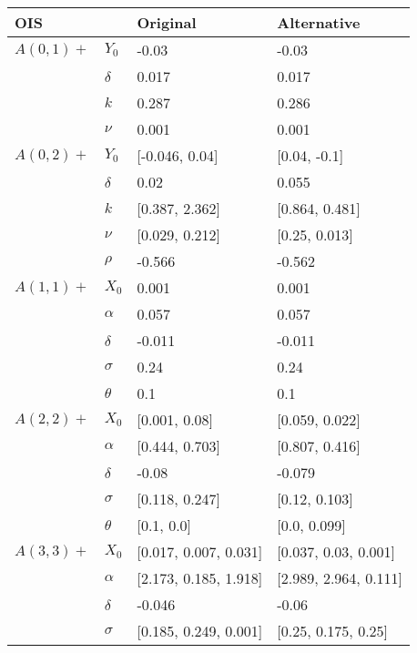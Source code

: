 \begin{tabular}{llll}
	\toprule
	OIS&       &               Original &            Alternative \\
	\midrule
	$A(0, 1)+$ & $Y_0$ &                  -0.03 &                  -0.03 \\
	& $\delta$ &                  0.017 &                  0.017 \\
	& $k$ &                  0.287 &                  0.286 \\
	& $\nu$ &                  0.001 &                  0.001 \\
	$A(0, 2)+$ & $Y_0$ &         [-0.046, 0.04] &           [0.04, -0.1] \\
	& $\delta$ &                   0.02 &                  0.055 \\
	& $k$ &         [0.387, 2.362] &         [0.864, 0.481] \\
	& $\nu$ &         [0.029, 0.212] &          [0.25, 0.013] \\
	& $\rho$ &                 -0.566 &                 -0.562 \\
	$A(1, 1)+$ & $X_0$ &                  0.001 &                  0.001 \\
	& $\alpha$ &                  0.057 &                  0.057 \\
	& $\delta$ &                 -0.011 &                 -0.011 \\
	& $\sigma$ &                   0.24 &                   0.24 \\
	& $\theta$ &                    0.1 &                    0.1 \\
	$A(2, 2)+$ & $X_0$ &          [0.001, 0.08] &         [0.059, 0.022] \\
	& $\alpha$ &         [0.444, 0.703] &         [0.807, 0.416] \\
	& $\delta$ &                  -0.08 &                 -0.079 \\
	& $\sigma$ &         [0.118, 0.247] &          [0.12, 0.103] \\
	& $\theta$ &             [0.1, 0.0] &           [0.0, 0.099] \\
	$A(3, 3)+$ & $X_0$ &  [0.017, 0.007, 0.031] &   [0.037, 0.03, 0.001] \\
	& $\alpha$ &  [2.173, 0.185, 1.918] &  [2.989, 2.964, 0.111] \\
	& $\delta$ &                 -0.046 &                  -0.06 \\
	& $\sigma$ &  [0.185, 0.249, 0.001] &    [0.25, 0.175, 0.25] \\

\end{tabular}
